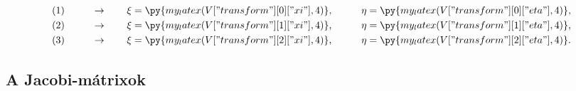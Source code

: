 \begin{myframe}
  \begin{alignat}{9}
     & (1) \qquad & \rightarrow \qquad \xi & = \py{my_latex(V["transform"][0]["xi"], 4)} \text, &  & \qquad \eta = \py{my_latex(V["transform"][0]["eta"], 4)} \text,
    \\
     & (2) \qquad & \rightarrow \qquad \xi & = \py{my_latex(V["transform"][1]["xi"], 4)} \text, &  & \qquad \eta = \py{my_latex(V["transform"][1]["eta"], 4)} \text,
    \label{eq:alma}
    \\
     & (3) \qquad & \rightarrow \qquad \xi & = \py{my_latex(V["transform"][2]["xi"], 4)} \text, &  & \qquad \eta = \py{my_latex(V["transform"][2]["eta"], 4)} \text.
  \end{alignat}
\end{myframe}

\subsection{A Jacobi-mátrixok}

